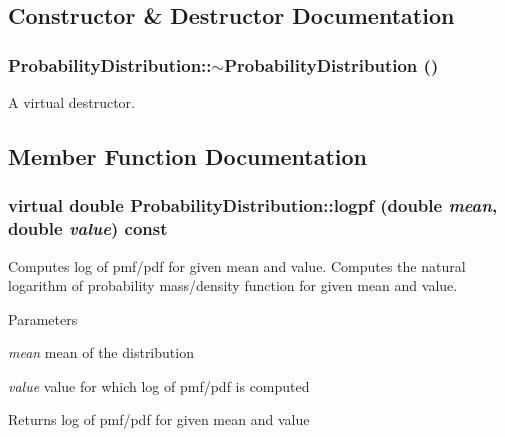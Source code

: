 \subsection{Constructor \& Destructor Documentation}
\hypertarget{classProbabilityDistribution_acb6a9c2d551cdfe6000b9b092b35a0d1}{
\subsubsection[{$\sim$ProbabilityDistribution}]{\setlength{\rightskip}{0pt plus 5cm}ProbabilityDistribution::$\sim$ProbabilityDistribution ()}}
\label{classProbabilityDistribution_acb6a9c2d551cdfe6000b9b092b35a0d1}
A virtual destructor. 

\subsection{Member Function Documentation}
\hypertarget{classProbabilityDistribution_a9ac2ee460523d2e8f77e7541c9d40ef7}{
\subsubsection[{logpf}]{\setlength{\rightskip}{0pt plus 5cm}virtual double ProbabilityDistribution::logpf (double {\em mean}, \/  double {\em value}) const}}
\label{classProbabilityDistribution_a9ac2ee460523d2e8f77e7541c9d40ef7}


Computes log of pmf/pdf for given mean and value. Computes the natural logarithm of probability mass/density function for given mean and value.


\begin{DoxyParams}{Parameters}
\item[{\em mean}]mean of the distribution \item[{\em value}]value for which log of pmf/pdf is computed \end{DoxyParams}
\begin{DoxyReturn}{Returns}
log of pmf/pdf for given mean and value 
\end{DoxyReturn}


